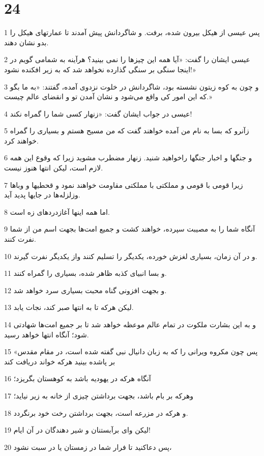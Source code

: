 \chapter{24}

\par 1 پس عیسی از هیکل بیرون شده، برفت. و شاگردانش پیش آمدند تا عمارتهای هیکل را بدو نشان دهند.
\par 2 عیسی ایشان را گفت: «آیا همه این چیزها را نمی بینید؟ هرآینه به شمامی گویم در اینجا سنگی بر سنگی گذارده نخواهد شد که به زیر افکنده نشود!»
\par 3 و چون به کوه زیتون نشسته بود، شاگردانش در خلوت نزدوی آمده، گفتند: «به ما بگو که این امور کی واقع می‌شود و نشان آمدن تو و انقضای عالم چیست.»
\par 4 عیسی در جواب ایشان گفت: «زنهار کسی شما را گمراه نکند!
\par 5 زآنرو که بسا به نام من آمده خواهند گفت که من مسیح هستم و بسیاری را گمراه خواهند کرد.
\par 6 و جنگها و اخبار جنگها راخواهید شنید. زنهار مضطرب مشوید زیرا که وقوع این همه لازم است، لیکن انتها هنوز نیست.
\par 7 زیرا قومی با قومی و مملکتی با مملکتی مقاومت خواهند نمود و قحطیها و وباها وزلزله‌ها در جایها پدید آید.
\par 8 اما همه اینها آغازدردهای زه است.
\par 9 آنگاه شما را به مصیبت سپرده، خواهند کشت و جمیع امت‌ها بجهت اسم من از شما نفرت کنند.
\par 10 و در آن زمان، بسیاری لغزش خورده، یکدیگر را تسلیم کنند واز یکدیگر نفرت گیرند.
\par 11 و بسا انبیای کذبه ظاهر شده، بسیاری را گمراه کنند.
\par 12 و بجهت افزونی گناه محبت بسیاری سرد خواهد شد.
\par 13 لیکن هر‌که تا به انتها صبر کند، نجات یابد.
\par 14 و به این بشارت ملکوت در تمام عالم موعظه خواهد شد تا بر جمیع امت‌ها شهادتی شود؛ آنگاه انتها خواهد رسید.
\par 15 «پس چون مکروه ویرانی را که به زبان دانیال نبی گفته شده است، در مقام مقدس بر پاشده بینید هر‌که خواند دریافت کند
\par 16 آنگاه هر‌که در یهودیه باشد به کوهستان بگریزد؛
\par 17 وهر‌که بر بام باشد، بجهت برداشتن چیزی از خانه به زیر نیاید؛
\par 18 و هر‌که در مزرعه است، بجهت برداشتن رخت خود برنگردد.
\par 19 لیکن وای برآبستنان و شیر دهندگان در آن ایام!
\par 20 پس دعاکنید تا فرار شما در زمستان یا در سبت نشود،
